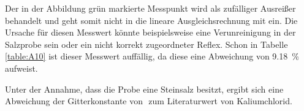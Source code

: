 

Der in der Abbildung grün markierte Messpunkt wird als zufälliger Ausreißer behandelt und geht somit nicht in die lineare Ausgleichsrechnung mit ein. Die Ursache für diesen Messwert könnte beispielsweise eine Verunreinigung in der Salzprobe sein oder ein nicht korrekt zugeordneter Reflex. Schon in Tabelle \ref{table:A10} ist dieser Messwert auffällig, da diese eine Abweichung von \SI{9.18}{\percent} aufweist.

Unter der Annahme, dass die Probe eine Steinsalz besitzt, ergibt sich eine Abweichung der Gitterkonstante von $$ zum Literaturwert \cite{Kaliumchlorid} von Kaliumchlorid.








